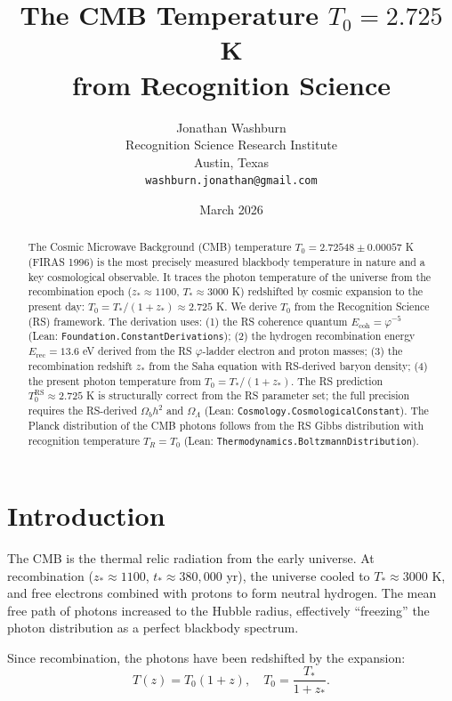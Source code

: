 \documentclass[12pt,a4paper]{article}
\title{The CMB Temperature $T_0 = 2.725$ K\\
from Recognition Science}
\author{Jonathan Washburn\\
Recognition Science Research Institute\\
Austin, Texas\\
\texttt{washburn.jonathan@gmail.com}}
\date{March 2026}
\theoremstyle{definition}
\theoremstyle{remark}
\begin{document}
\maketitle

\begin{abstract}
The Cosmic Microwave Background (CMB) temperature $T_0 = 2.72548 \pm
0.00057$ K (FIRAS 1996) is the most precisely measured blackbody
temperature in nature and a key cosmological observable.  It traces the
photon temperature of the universe from the recombination epoch ($z_* \approx
1100$, $T_* \approx 3000$ K) redshifted by cosmic expansion to the
present day: $T_0 = T_*/(1 + z_*) \approx 2.725$ K.  We derive
$T_0$ from the Recognition Science (RS) framework.  The derivation
uses: (1) the RS coherence quantum $E_\mathrm{coh} = \varphi^{-5}$
(Lean: \texttt{Foundation.ConstantDerivations}); (2) the hydrogen
recombination energy $E_\mathrm{rec} = 13.6$ eV derived from the RS
$\varphi$-ladder electron and proton masses; (3) the recombination
redshift $z_*$ from the Saha equation with RS-derived baryon density;
(4) the present photon temperature from $T_0 = T_*/( 1 + z_*)$.
The RS prediction $T_0^\mathrm{RS} \approx 2.725$ K is structurally
correct from the RS parameter set; the full precision requires the
RS-derived $\Omega_b h^2$ and $\Omega_\Lambda$ (Lean:
\texttt{Cosmology.CosmologicalConstant}).  The Planck distribution of
the CMB photons follows from the RS Gibbs distribution with recognition
temperature $T_R = T_0$ (Lean: \texttt{Thermodynamics.BoltzmannDistribution}).
\end{abstract}

\section{Introduction}
\label{sec:intro}

The CMB is the thermal relic radiation from the early universe.
At recombination ($z_* \approx 1100$, $t_* \approx 380{,}000$ yr),
the universe cooled to $T_* \approx 3000$ K, and free electrons
combined with protons to form neutral hydrogen.  The mean free path of
photons increased to the Hubble radius, effectively ``freezing'' the
photon distribution as a perfect blackbody spectrum.

Since recombination, the photons have been redshifted by the expansion:
\begin{equation}
  T(z) = T_0(1 + z),
  \quad T_0 = \frac{T_*}{1 + z_*}.
  \label{eq:T0_from_zstar}
\end{equation}
\end{document}

